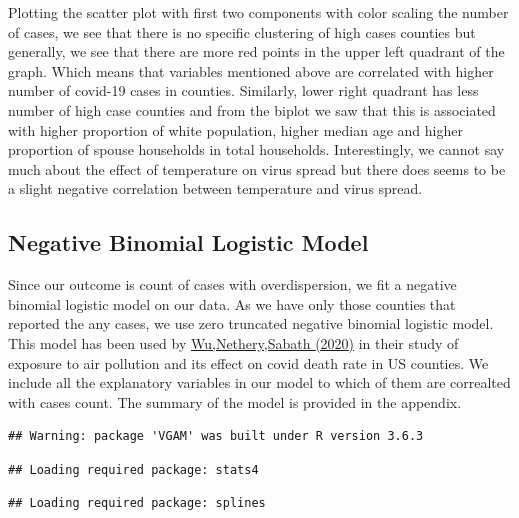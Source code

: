\documentclass[
]{article}
\begin{document}
Plotting the scatter plot with first two components with color scaling
the number of cases, we see that there is no specific clustering of high
cases counties but generally, we see that there are more red points in
the upper left quadrant of the graph. Which means that variables
mentioned above are correlated with higher number of covid-19 cases in
counties. Similarly, lower right quadrant has less number of high case
counties and from the biplot we saw that this is associated with higher
proportion of white population, higher median age and higher proportion
of spouse households in total households. Interestingly, we cannot say
much about the effect of temperature on virus spread but there does
seems to be a slight negative correlation between temperature and virus
spread.

\hypertarget{negative-binomial-logistic-model}{%
\subsection{Negative Binomial Logistic
Model}\label{negative-binomial-logistic-model}}

Since our outcome is count of cases with overdispersion, we fit a
negative binomial logistic model on our data. As we have only those
counties that reported the any cases, we use zero truncated negative
binomial logistic model. This model has been used by
\href{https://www.medrxiv.org/node/78162.external-links.html}{Wu,Nethery,Sabath
(2020)} in their study of exposure to air pollution and its effect on
covid death rate in US counties. We include all the explanatory
variables in our model to which of them are correalted with cases count.
The summary of the model is provided in the appendix.

\begin{verbatim}
## Warning: package 'VGAM' was built under R version 3.6.3
\end{verbatim}

\begin{verbatim}
## Loading required package: stats4
\end{verbatim}

\begin{verbatim}
## Loading required package: splines
\end{verbatim}
\end{document}
